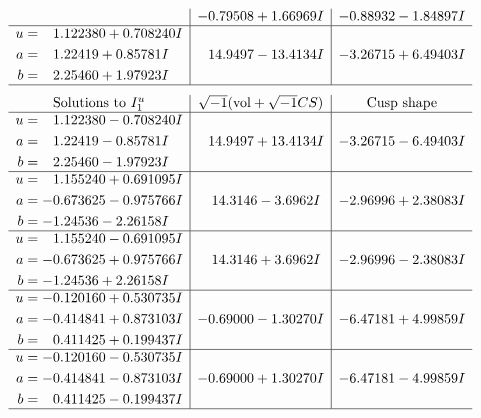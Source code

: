 \documentclass[1p]{elsarticle_modified}
\theoremstyle{definition}
\newcommand{\I}{\sqrt{-1}}
\begin{document}
$$\begin{array}{c|c|c}
 & -0.79508 + 1.66969 I & -0.88932 - 1.84897 I \\ \hline\begin{aligned}
u &= \phantom{-}1.122380 + 0.708240 I \\
a &= \phantom{-}1.22419 + 0.85781 I \\
b &= \phantom{-}2.25460 + 1.97923 I\end{aligned}
 & \phantom{-}14.9497 - 13.4134 I & -3.26715 + 6.49403 I\\
 \hline 
 \end{array}$$\newpage$$\begin{array}{c|c|c}  
\text{Solutions to }I^u_{1}& \I (\text{vol} + \sqrt{-1}CS) & \text{Cusp shape}\\
 \hline 
\begin{aligned}
u &= \phantom{-}1.122380 - 0.708240 I \\
a &= \phantom{-}1.22419 - 0.85781 I \\
b &= \phantom{-}2.25460 - 1.97923 I\end{aligned}
 & \phantom{-}14.9497 + 13.4134 I & -3.26715 - 6.49403 I \\ \hline\begin{aligned}
u &= \phantom{-}1.155240 + 0.691095 I \\
a &= -0.673625 - 0.975766 I \\
b &= -1.24536 - 2.26158 I\end{aligned}
 & \phantom{-}14.3146 - 3.6962 I & -2.96996 + 2.38083 I \\ \hline\begin{aligned}
u &= \phantom{-}1.155240 - 0.691095 I \\
a &= -0.673625 + 0.975766 I \\
b &= -1.24536 + 2.26158 I\end{aligned}
 & \phantom{-}14.3146 + 3.6962 I & -2.96996 - 2.38083 I \\ \hline\begin{aligned}
u &= -0.120160 + 0.530735 I \\
a &= -0.414841 + 0.873103 I \\
b &= \phantom{-}0.411425 + 0.199437 I\end{aligned}
 & -0.69000 - 1.30270 I & -6.47181 + 4.99859 I \\ \hline\begin{aligned}
u &= -0.120160 - 0.530735 I \\
a &= -0.414841 - 0.873103 I \\
b &= \phantom{-}0.411425 - 0.199437 I\end{aligned}
 & -0.69000 + 1.30270 I & -6.47181 - 4.99859 I\\
 \hline 
 \end{array}$$\newpage\newpage\renewcommand{\arraystretch}{1}
\end{document}
